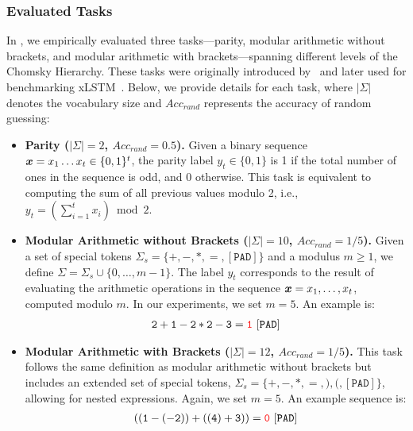 \documentclass{article} %
\begin{document}
\subsubsection{Evaluated Tasks}
In , we empirically evaluated three tasks—parity, modular arithmetic without brackets, and modular arithmetic with brackets—spanning different levels of the Chomsky Hierarchy. These tasks were originally introduced by~\citet{deletang-iclr23a} and later used for benchmarking xLSTM~\citep[Figure 4]{beck-neurips24a}. Below, we provide details for each task, where $|\Sigma|$ denotes the vocabulary size and $Acc_{rand}$ represents the accuracy of random guessing:
\begin{itemize}[leftmargin=*]
    \item \textbf{Parity ($|\Sigma| =2$, $Acc_{rand}=0.5$).} Given a binary sequence ${\bm{x}} = x_1 \dots x_t \in \{0,1\}^t$, the parity label $y_t \in \{0,1\}$ is 1 if the total number of ones in the sequence is odd, and 0 otherwise. This task is equivalent to computing the sum of all previous values modulo 2, i.e., $y_t = (\sum_{i=1}^{t} x_i) \bmod 2$.
    \item \textbf{Modular Arithmetic without Brackets (\(|\Sigma| = 10\), \(Acc_{rand}=1/5\)).} Given a set of special tokens \( \Sigma_s = \{ \mathtt{+,-,*,=,[ PAD ]} \} \) and a modulus \( m \geq 1 \), we define \( \Sigma = \Sigma_s \cup \{ 0,\dots ,m-1 \} \). The label \( y_t \) corresponds to the result of evaluating the arithmetic operations in the sequence \( {\bm{x}} = x_1,\dots,x_t \), computed modulo \( m \). In our experiments, we set \( m=5 \). An example is:  
    \begin{align*}
        \mathtt{2 + 1 - 2 * 2 -3 = \mathbin{\color{red}{1}}\ [PAD]}
    \end{align*}
    \item \textbf{Modular Arithmetic with Brackets (\(|\Sigma| = 12\), \(Acc_{rand}=1/5\)).} This task follows the same definition as modular arithmetic without brackets but includes an extended set of special tokens, \( \Sigma_s = \{ \mathtt{+,-,*,=,),(,[ PAD ]} \} \), allowing for nested expressions. Again, we set \( m=5 \). An example sequence is: 
    \begin{align*}
        \mathtt{((1-(-2))+((4)+3)) = \mathbin{\color{red}{0}}\ [PAD]}
    \end{align*}
\end{itemize}
\end{document}
